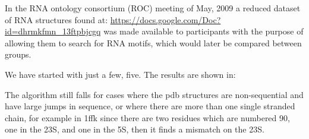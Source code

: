In the  RNA ontology consortium (ROC)  meeting of May,  2009 a reduced
dataset        of        RNA        structures        found        at:
\url{https://docs.google.com/Doc?id=dhrmkfmn_13ftpbjcgq}    was   made
available to participants with the  purpose of allowing them to search
for RNA motifs, which would later be compared between groups.

We have started with just a few, five. The results are shown in:

The  algorithm still  falls for  cases  where the  pdb structures  are
non-sequential and  have large jumps  in sequence, or where  there are
more than one  single stranded chain, for example  in 1ffk since there
are two residues which are numbered 90, one in the 23S, and one in the
5S, then it finds a mismatch on the 23S.





